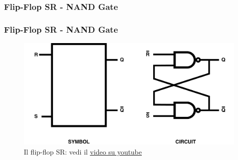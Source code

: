 \subsubsection[Flip-Flop SR - NAND Gate]{Flip-Flop SR - NAND Gate}
\begin{frame}
	\frametitle{Flip-Flop SR - NAND Gate}
	 
	\begin{figure}[!htbp]  
		\centering
		\includegraphics[width=0.95\linewidth]{images/5_memory/flip_flop_sr_nand.pdf}
		\caption{Il flip-flop SR: vedi il \underline{\href{https://www.youtube.com/watch?v=Y9k2oiSJkz4}{video su youtube}}}
	\end{figure}
	
\end{frame}
%
%
%	 
%	
%
%
%	 
